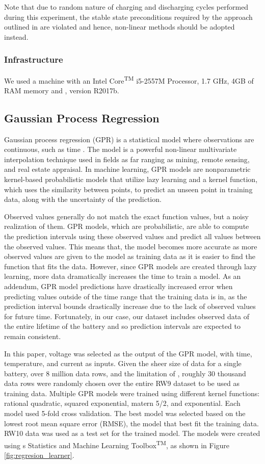 Note that due to random nature of charging and discharging cycles performed during this experiment, the stable state preconditions required by the approach outlined in \cite{5571895} are violated and hence, non-linear methods should be adopted instead.

\subsubsection{Infrastructure} We used a machine with an Intel Core\textsuperscript{TM} i5-2557M Processor, 1.7 GHz, 4GB of RAM memory and \MATLAB, version R2017b.
\subsection{Gaussian Process Regression}

Gaussian process regression (GPR) is a statistical model where observations are continuous, such as time \cite{10.1371/journal.pone.0163004}.  The model is a powerful non-linear multivariate interpolation technique used in fields as far ranging as mining, remote sensing, and real estate appraisal. In machine learning, GPR models are nonparametric kernel-based probabilistic models that utilize lazy learning and a kernel function, which uses the similarity between points, to predict an unseen point in training data, along with the uncertainty of the prediction.

Observed values generally do not match the exact function values, but a noisy realization of them.  GPR models, which are probabilistic, are able to compute the prediction intervals using these observed values and predict all values between the observed values.  This means that, the model becomes more accurate as more observed values are given to the model as training data as it is easier to find the function that fits the data.  However, since GPR models are created through lazy learning, more data dramatically increases the time to train a model.  As an addendum, GPR model predictions have drastically increased error when predicting values outside of the time range that the training data is in, as the prediction interval bounds drastically increase due to the lack of observed values for future time.  Fortunately, in our case, our dataset includes observed data of the entire lifetime of the battery and so prediction intervals are expected to remain consistent.


In this paper, voltage was selected as the output of the GPR model, with time, temperature, and current as inputs.  Given the sheer size of data for a single battery, over 8 million data rows, and the limitation of \MATLAB, roughly 30 thousand data rows were randomly chosen over the entire RW9 dataset to be used as training data.  Multiple GPR models were trained using different kernel functions: rational quadratic, squared exponential, matern 5/2, and exponential.  Each model used 5-fold cross validation.  The best model was selected based on the lowest root mean square error (RMSE), the model that best fit the training data.  RW10 data was used as a test set for the trained model.  The models were created using \MATLAB\textquotesingle s Statistics and Machine Learning Toolbox\textsuperscript{TM}, as shown in Figure \ref{fig:regresion_learner}.

